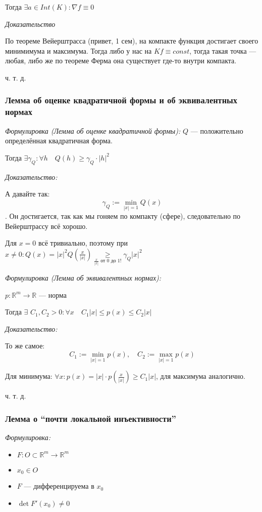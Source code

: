 \documentclass{article}
\def\dbl{\,\,}
\begin{document}
Тогда $\exists a \in Int(K): \nabla f \equiv 0$

\textit{Доказательство}

По теореме Вейерштрасса (привет, 1 сем), на компакте функция достигает своего минимимума и максимума.
Тогда либо у нас на $K f \equiv const$, тогда такая точка --- любая, либо же по теореме Ферма она существует где-то внутри компакта.

ч. т. д.



\subsubsection{Лемма об оценке квадратичной формы и об эквивалентных нормах}
\textit{Формулировка (Лемма об оценке квадратичной формы):}
$Q$ --- положительно определённая квадратичная форма.

Тогда $\exists \gamma_Q: \forall h \quad Q(h) \ge \gamma_Q \cdot |h|^2$

\textit{Доказательство:}

А давайте так: $$\gamma_Q := \min_{|x| = 1}{Q(x)}$$. Он достигается, так как мы гоняем по компакту (сфере), следовательно по Вейерштрассу всё хорошо.

Для $x = 0$ всё тривиально, поэтому при $x \neq 0: Q(x) = |x|^2Q(\frac{x}{|x|}) \underset{\frac{x}{|x|}\text{ от 0 до 1!}}{\ge} \gamma_Q|x|^2$

\textit{Формулировка (Лемма об эквивалентных нормах):}

$p: \mathbb{R}^m \rightarrow \mathbb{R}$ --- норма

Тогда $\exists \dbl C_1, C_2 > 0: \forall x \quad C_1|x| \le p(x) \le C_2|x|$

\textit{Доказательство:}

То же самое: $$C_1 := \min_{|x| = 1}{p(x)}, \quad C_2 := \max_{|x| = 1}{p(x)}$$

Для минимума: $\forall x: p(x) = |x| \cdot p(\frac{x}{|x|}) \ge C_1|x|$, для максимума аналогично.

ч. т. д.

\subsubsection{Лемма о ``почти локальной инъективности''}
\textit{Формулировка:}

\begin{itemize}
    \item $F: O \subset \mathbb{R}^m \rightarrow \mathbb{R}^m$
    \item $x_0 \in O$
    \item $F$ --- дифференцируема в $x_0$
    \item $\det F'(x_0) \neq 0 $
\end{itemize}
\end{document}
